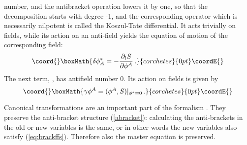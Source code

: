 \documentclass[a4paper,12pt]{article}
\begin{document}
number, and the antibracket operation lowers it by one, so that the
decomposition starts with degree -1, and the corresponding operator
\myHighlight{$\delta$}\coordHE{} which is necessarily nilpotent is called the Koszul-Tate
differential. It acts trivially on fields, while its action on an
anti-field yields the equation of motion of the corresponding field:
\begin{displaymath}\coord{}\boxMath{
  \delta \phi_A^* = - \frac{\partial_l S}{\partial \phi^A} \, .
}{corchetes}{0pt}\coordE{}\end{displaymath}
The next term, \myHighlight{$\gamma$}\coordHE{}, has antifield number 0. Its action on fields
is given by
\begin{displaymath}\coord{}\boxMath{ \label{eq:BRST}
  \gamma \phi^A = (\phi^A, S) |_{\phi^* = 0} \, .
}{corchetes}{0pt}\coordE{}\end{displaymath}

Canonical transformations are an important part of the formalism  
\cite{cano}. 
They preserve the anti-bracket structure (\ref{abracket}): 
calculating the anti-brackets in the old or
new variables is the same, or in other words the new variables also
satisfy (\ref{eq:brackffs}). Therefore also
the master equation \coordHE{} is preserved. 
\end{document}
